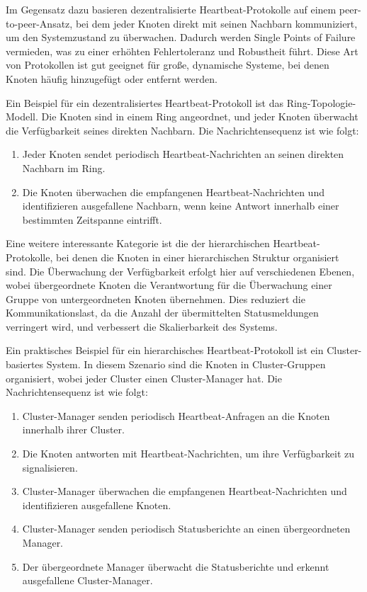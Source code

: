 \documentclass[../vs-script-first-v01.tex]{subfiles}
\begin{document}
Im Gegensatz dazu basieren dezentralisierte Heartbeat-Protokolle auf einem peer-to-peer-Ansatz, bei dem jeder Knoten direkt mit seinen Nachbarn kommuniziert, um den Systemzustand zu überwachen. Dadurch werden Single Points of Failure vermieden, was zu einer erhöhten Fehlertoleranz und Robustheit führt. Diese Art von Protokollen ist gut geeignet für große, dynamische Systeme, bei denen Knoten häufig hinzugefügt oder entfernt werden.

Ein Beispiel für ein dezentralisiertes Heartbeat-Protokoll ist das Ring-Topologie-Modell. Die Knoten sind in einem Ring angeordnet, und jeder Knoten überwacht die Verfügbarkeit seines direkten Nachbarn. Die Nachrichtensequenz ist wie folgt:
\begin{enumerate}[label=(\alph*)]
\item Jeder Knoten sendet periodisch Heartbeat-Nachrichten an seinen direkten Nachbarn im Ring.
\item Die Knoten überwachen die empfangenen Heartbeat-Nachrichten und identifizieren ausgefallene Nachbarn, wenn keine Antwort innerhalb einer bestimmten Zeitspanne eintrifft.
\end{enumerate}

Eine weitere interessante Kategorie ist die der hierarchischen Heartbeat-Protokolle, bei denen die Knoten in einer hierarchischen Struktur organisiert sind. Die Überwachung der Verfügbarkeit erfolgt hier auf verschiedenen Ebenen, wobei übergeordnete Knoten die Verantwortung für die Überwachung einer Gruppe von untergeordneten Knoten übernehmen. Dies reduziert die Kommunikationslast, da die Anzahl der übermittelten Statusmeldungen verringert wird, und verbessert die Skalierbarkeit des Systems.

Ein praktisches Beispiel für ein hierarchisches Heartbeat-Protokoll ist ein Cluster-basiertes System. In diesem Szenario sind die Knoten in Cluster-Gruppen organisiert, wobei jeder Cluster einen Cluster-Manager hat. Die Nachrichtensequenz ist wie folgt:
\begin{enumerate}[label=(\alph*)]
\item Cluster-Manager senden periodisch Heartbeat-Anfragen an die Knoten innerhalb ihrer Cluster.
\item Die Knoten antworten mit Heartbeat-Nachrichten, um ihre Verfügbarkeit zu signalisieren.
\item Cluster-Manager überwachen die empfangenen Heartbeat-Nachrichten und identifizieren ausgefallene Knoten.
\item Cluster-Manager senden periodisch Statusberichte an einen übergeordneten Manager.
\item Der übergeordnete Manager überwacht die Statusberichte und erkennt ausgefallene Cluster-Manager.
\end{enumerate}
\end{document}
